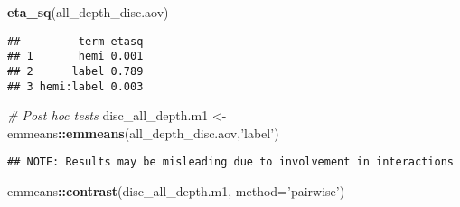 \documentclass[
]{article}
\newenvironment{Shaded}{\begin{snugshade}}{\end{snugshade}}
\newcommand{\CommentTok}[1]{\textcolor[rgb]{0.56,0.35,0.01}{\textit{#1}}}
\newcommand{\DataTypeTok}[1]{\textcolor[rgb]{0.13,0.29,0.53}{#1}}
\newcommand{\KeywordTok}[1]{\textcolor[rgb]{0.13,0.29,0.53}{\textbf{#1}}}
\newcommand{\NormalTok}[1]{#1}
\newcommand{\OperatorTok}[1]{\textcolor[rgb]{0.81,0.36,0.00}{\textbf{#1}}}
\newcommand{\StringTok}[1]{\textcolor[rgb]{0.31,0.60,0.02}{#1}}
\begin{document}
\begin{Shaded}
\begin{Highlighting}[]
\KeywordTok{eta_sq}\NormalTok{(all_depth_disc.aov)}
\end{Highlighting}
\end{Shaded}

\begin{verbatim}
##         term etasq
## 1       hemi 0.001
## 2      label 0.789
## 3 hemi:label 0.003
\end{verbatim}

\begin{Shaded}
\begin{Highlighting}[]
\CommentTok{# Post hoc tests}
\NormalTok{disc_all_depth.m1 <-}\StringTok{ }\NormalTok{emmeans}\OperatorTok{::}\KeywordTok{emmeans}\NormalTok{(all_depth_disc.aov,}\StringTok{'label'}\NormalTok{)}
\end{Highlighting}
\end{Shaded}

\begin{verbatim}
## NOTE: Results may be misleading due to involvement in interactions
\end{verbatim}

\begin{Shaded}
\begin{Highlighting}[]
\NormalTok{emmeans}\OperatorTok{::}\KeywordTok{contrast}\NormalTok{(disc_all_depth.m1, }\DataTypeTok{method=}\StringTok{'pairwise'}\NormalTok{)}
\end{Highlighting}
\end{Shaded}
\end{document}
